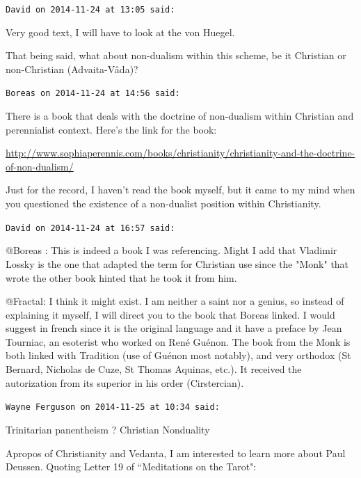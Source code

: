 \begin{footnotesize}\begin{sffamily}



\texttt{David on 2014-11-24 at 13:05 said: }

Very good text, I will have to look at the von Huegel. 

That being said, what about non-dualism within this scheme, be it Christian or non-Christian (Advaita-Vâda)?


\hfill

\texttt{Boreas on 2014-11-24 at 14:56 said: }

There is a book that deals with the doctrine of non-dualism within Christian and perennialist context. Here's the link for the book:

\url{http://www.sophiaperennis.com/books/christianity/christianity-and-the-doctrine-of-non-dualism/}

Just for the record, I haven't read the book myself, but it came to my mind when you questioned the existence of a non-dualist position within Christianity.


\hfill

\texttt{David on 2014-11-24 at 16:57 said: }

@Boreas : This is indeed a book I was referencing. Might I add that Vladimir Lossky is the one that adapted the term for Christian use since the "Monk" that wrote the other book hinted that he took it from him.

@Fractal: I think it might exist. I am neither a saint nor a genius, so instead of explaining it myself, I will direct you to the book that Boreas linked. I would suggest in french since it is the original language and it have a preface by Jean Tourniac, an esoterist who worked on René Guénon. The book from the Monk is both linked with Tradition (use of Guénon most notably), and very orthodox (St Bernard, Nicholas de Cuze, St Thomas Aquinas, etc.). It received the autorization from its superior in his order (Cirstercian).


\hfill

\texttt{Wayne Ferguson on 2014-11-25 at 10:34 said: }

Trinitarian panentheism ? Christian Nonduality

Apropos of Christianity and Vedanta, I am interested to learn more about Paul Deussen. Quoting Letter 19 of ``Meditations on the Tarot":


\end{sffamily}
\end{footnotesize}
